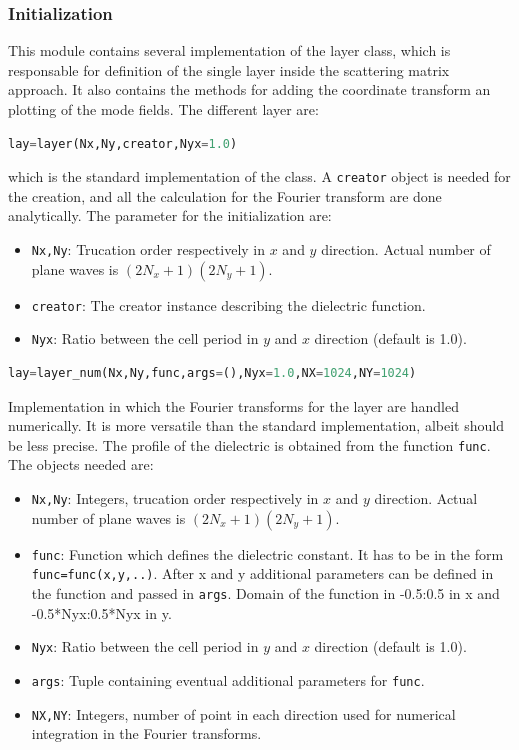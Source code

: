 \documentclass[a4paper,10pt]{report}
\begin{document}
\subsubsection{Initialization}
This module contains several implementation of the layer class, which is responsable for definition of the single layer inside the scattering matrix approach. It also contains the methods for adding the coordinate transform an plotting of the mode fields. The different layer are:
\begin{lstlisting}[language=Python]
lay=layer(Nx,Ny,creator,Nyx=1.0)
\end{lstlisting}
which is the standard implementation of the class. A \texttt{creator} object is needed for the creation, and all the calculation for the Fourier transform are done analytically. The parameter for the initialization are:
\begin{itemize}[noitemsep,topsep=0pt,parsep=0pt,partopsep=0pt]
\item \texttt{Nx,Ny}: Trucation order respectively in $x$ and $y$ direction. Actual number of plane waves is $(2N_x+1)(2N_y+1)$.
\item \texttt{creator}: The creator instance describing the dielectric function.
\item \texttt{Nyx}: Ratio between the cell period in $y$ and $x$ direction (default is 1.0).
\end{itemize}

\begin{lstlisting}[language=Python]
lay=layer_num(Nx,Ny,func,args=(),Nyx=1.0,NX=1024,NY=1024)
\end{lstlisting}
Implementation in which the Fourier transforms for the layer are handled numerically. It is more versatile than the standard implementation, albeit should be less precise. The profile of the dielectric is obtained from the function \texttt{func}. The objects needed are:
\begin{itemize}[noitemsep,topsep=0pt,parsep=0pt,partopsep=0pt]
\item \texttt{Nx,Ny}: Integers, trucation order respectively in $x$ and $y$ direction. Actual number of plane waves is $(2N_x+1)(2N_y+1)$.
\item \texttt{func}: Function which defines the dielectric constant. It has to be in the form \texttt{func=func(x,y,..)}. After x and y additional parameters can be defined in the function and passed in \texttt{args}. Domain of the function in -0.5:0.5 in x and -0.5*Nyx:0.5*Nyx in y. 
\item \texttt{Nyx}: Ratio between the cell period in $y$ and $x$ direction (default is 1.0).
\item \texttt{args}: Tuple containing eventual additional parameters for \texttt{func}.
\item \texttt{NX,NY}: Integers, number of point in each direction used for numerical integration in the Fourier transforms.
\end{itemize}
\end{document}

